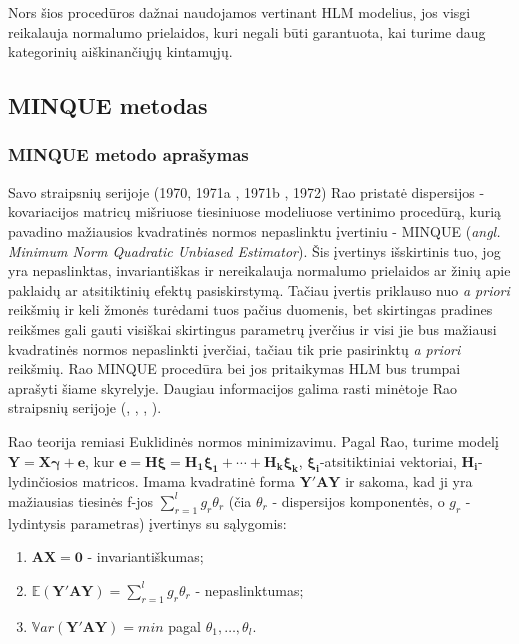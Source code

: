 \documentclass[12pt,a4paper]{article}
\begin{document}
\indent Nors šios procedūros dažnai naudojamos vertinant HLM modelius, jos visgi reikalauja normalumo prielaidos, kuri negali būti garantuota, kai turime daug kategorinių aiškinančiųjų kintamųjų.

\subsection{MINQUE metodas}\label{subsec:minque}
\subsubsection{MINQUE metodo aprašymas}

\indent Savo straipsnių serijoje (1970\cite{rao1970}, 1971a\cite{rao1971a} , 1971b\cite{rao1971b} , 1972\cite{rao1972}) Rao pristatė dispersijos - kovariacijos matricų mišriuose tiesiniuose modeliuose vertinimo procedūrą, kurią pavadino mažiausios kvadratinės normos nepaslinktu įvertiniu - MINQUE (\textit{angl. Minimum Norm Quadratic Unbiased Estimator}). Šis įvertinys išskirtinis tuo, jog yra nepaslinktas, invariantiškas ir nereikalauja normalumo prielaidos ar žinių apie paklaidų ar atsitiktinių efektų pasiskirstymą. Tačiau įvertis priklauso nuo \textit{a priori} reikšmių ir keli žmonės turėdami tuos pačius duomenis, bet skirtingas pradines reikšmes gali gauti visiškai skirtingus parametrų įverčius ir visi jie bus mažiausi kvadratinės normos nepaslinkti įverčiai, tačiau tik prie pasirinktų \textit{a priori} reikšmių. Rao MINQUE procedūra bei jos pritaikymas HLM bus trumpai aprašyti šiame skyrelyje. Daugiau informacijos galima rasti minėtoje Rao straipsnių serijoje (\cite{rao1970}, \cite{rao1971a} , \cite{rao1971b} , \cite{rao1972}).

\indent Rao teorija remiasi Euklidinės normos minimizavimu. Pagal Rao, turime modelį $\mathbf{Y}=\mathbf{X}\boldsymbol{\gamma}+\mathbf{e}$, kur $\mathbf{e}=\mathbf{H\boldsymbol{\xi}}=\mathbf{\boldsymbol{H_1\xi_1+\cdots +H_k \xi_k}}$, $\boldsymbol{\xi_i}$-atsitiktiniai vektoriai, $\mathbf{H_i}$-lydinčiosios matricos. Imama kvadratinė forma $\mathbf{Y'AY}$ ir sakoma, kad ji yra mažiausias tiesinės f-jos $\sum^l_{r=1} g_r\theta_r$ (čia $\theta_r$ - dispersijos komponentės, o $g_r$ - lydintysis parametras) įvertinys su sąlygomis:
\begin{enumerate}
\item $\mathbf{AX=0}$ - invariantiškumas;
\item $\mathbb{E}\left(\mathbf{Y'AY}\right)=\sum^l_{r=1} g_r\theta_r$ - nepaslinktumas;
\item $\mathbb{V}ar\left(\mathbf{Y'AY}\right)=min$ pagal $\theta_1, \dots, \theta_l$.
\end{enumerate}
\end{document}
